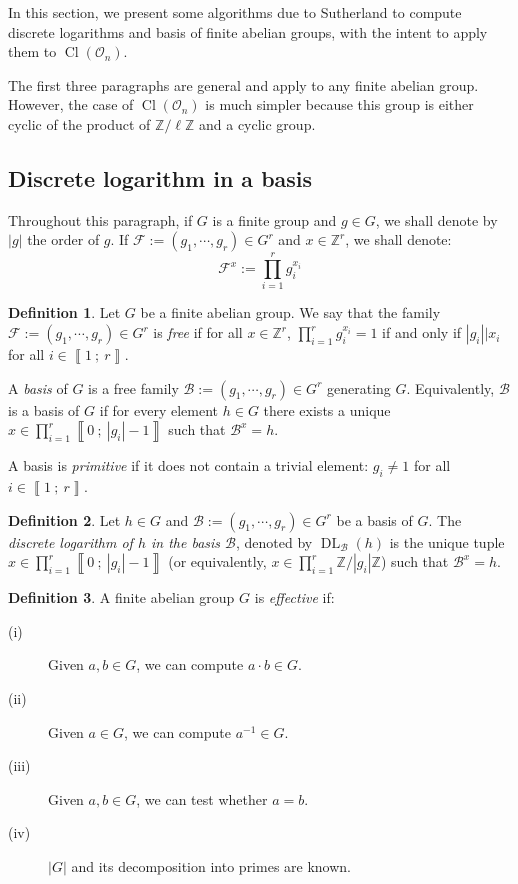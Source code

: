 \documentclass[a4paper,10pt]{report}
\theoremstyle{definition}
\newtheorem{definition}{Definition}[chapter]
\theoremstyle{plain}
\theoremstyle{definition}
\newcommand{\Z}{\mathbb{Z}}
\newcommand{\m}[1]{\mathcal{#1}}
\newcommand{\mO}{\mathcal{O}}
\renewcommand{\i}[2]{\left\llbracket #1~;~#2\right\rrbracket}
\renewcommand{\(}{\left(}
\renewcommand{\)}{\right)}
\DeclareMathOperator{\Cl}{Cl}
\DeclareMathOperator{\DL}{DL}
\begin{document}
In this section, we present some algorithms due to Sutherland \cite{Sutherland2010} to compute discrete logarithms and basis of finite abelian groups, with the intent to apply them to $\Cl(\mO_n)$.

The first three paragraphs are general and apply to any finite abelian group. However, the case of $\Cl(\mO_n)$ is much simpler because this group is either cyclic of the product of $\Z/\ell\Z$ and a cyclic group.

\subsection{Discrete logarithm in a basis}

Throughout this paragraph, if $G$ is a finite group and $g\in G$, we shall denote by $|g|$ the order of $g$. If $\m{F}:=(g_1,\cdots, g_r)\in G^r$ and $x\in\Z^r$, we shall denote:
\[\m{F}^x:=\prod_{i=1}^r g_i^{x_i}\]

\begin{definition}
Let $G$ be a finite abelian group.  We say that the family $\m{F}:=(g_1,\cdots, g_r)\in G^r$ is \emph{free} if for all $x\in \Z^r$, $\prod_{i=1}^{r}g_i^{x_i}=1$ if and only if $|g_i||x_i$ for all $i\in\i{1}{r}$.


A \emph{basis} of $G$ is a free family $\m{B}:=(g_1,\cdots, g_r)\in G^r$ generating $G$. Equivalently, $\m{B}$ is a basis of $G$ if for every element $h\in G$ there exists a unique $x\in\prod_{i=1}^r\i{0}{|g_i|-1}$ such that $\m{B}^x=h$.

A basis is \emph{primitive} if it does not contain a trivial element: $g_i\neq 1$ for all $i\in\i{1}{r}$.
\end{definition}

\begin{definition}
Let $h\in G$ and $\m{B}:=(g_1,\cdots, g_r)\in G^r$ be a basis of $G$. The \emph{discrete logarithm of $h$ in the basis $\m{B}$}, denoted by $\DL_{\m{B}}(h)$ is the unique tuple $x\in\prod_{i=1}^r\i{0}{|g_i|-1}$ (or equivalently, $x\in\prod_{i=1}^r\Z/|g_i|\Z$)  such that $\m{B}^x=h$. 
\end{definition}

\begin{definition}
A finite abelian group $G$ is \emph{effective} if: 
\begin{description}
\item[(i)] Given $a, b\in G$, we can compute $a\cdot b\in G$.
\item[(ii)] Given $a\in G$, we can compute $a^{-1}\in G$.
\item[(iii)] Given $a, b\in G$, we can test whether $a=b$.
\item[(iv)] $|G|$ and its decomposition into primes are known.
\end{description}
\end{definition}
\end{document}
